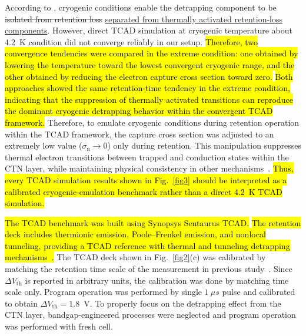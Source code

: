 \documentclass[journal,twoside,web]{ieeecolor}
\begin{document}
According to \cite{Refaldi.IRPS2025}, cryogenic conditions enable the detrapping component to be \sout{isolated from retention loss} \uline{separated from thermally activated retention-loss components}.
However, direct TCAD simulation at cryogenic temperature about 4.2~K condition did not converge reliably in our setup.
\hl{Therefore, two convergence tendencies were compared in the extreme condition: one obtained by lowering the temperature toward the lowest convergent cryogenic range, and the other obtained by reducing the electron capture cross section toward zero.}
\hl{Both approaches showed the same retention-time tendency in the extreme condition, indicating that the suppression of thermally activated transitions can reproduce the dominant cryogenic detrapping behavior within the convergent TCAD framework.}
Therefore, to emulate cryogenic conditions during retention operation within the TCAD framework, the capture cross section was adjusted to an extremely low value ($\sigma_\mathrm{n} \rightarrow 0$) only during retention.
This manipulation suppresses thermal electron transitions between trapped and conduction states within the CTN layer, while maintaining physical consistency in other mechanisms~\cite{TCADmanual.2022}.
\hl{Thus, every TCAD simulation results shown in \hbox{Fig.~\ref{fig3}} should be interpreted as a calibrated cryogenic-emulation benchmark rather than a direct 4.2~K TCAD simulation.}

\hl{The TCAD benchmark was built using Synopsys Sentaurus TCAD.}
\hl{The retention deck includes thermionic emission, Poole--Frenkel emission, and nonlocal tunneling, providing a TCAD reference with thermal and tunneling detrapping mechanisms~\hbox{\cite{TCADmanual.2022}}.}
The TCAD deck shown in Fig.~\ref{fig2}(c) was calibrated by matching the retention time scale of the measurement in previous study~\cite{Refaldi.IRPS2025}.
Since $\Delta V_\text{th}$ is reported in arbitrary units, the calibration was done by matching time scale only.
Program operation was performed by single $1~\mu s$ pulse and calibrated to obtain $\Delta V_\text{th} = 1.8$~V.
To properly focus on the detrapping effect from the CTN layer, bandgap-engineered processes were neglected and program operation was performed with fresh cell.
\end{document}
